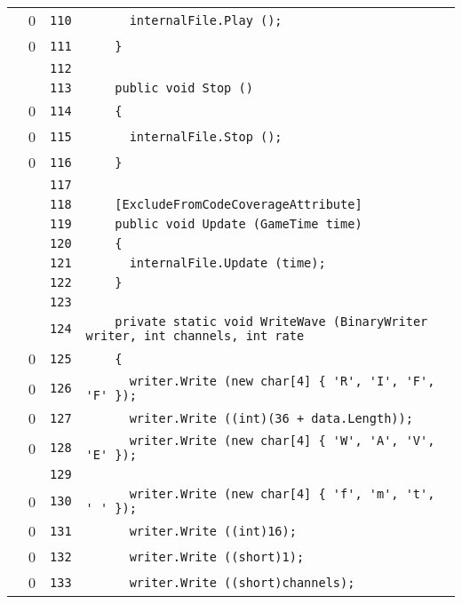 \documentclass[a4paper,10pt]{article}
\begin{document}
\begin{longtable}[l]{lrrl}
\cellcolor{red} & 0 & \verb~110~ & \verb~      internalFile.Play ();~\\
\cellcolor{red} & 0 & \verb~111~ & \verb~    }~\\
\cellcolor{gray} &  & \verb~112~ & \verb~~\\
\cellcolor{gray} &  & \verb~113~ & \verb~    public void Stop ()~\\
\cellcolor{red} & 0 & \verb~114~ & \verb~    {~\\
\cellcolor{red} & 0 & \verb~115~ & \verb~      internalFile.Stop ();~\\
\cellcolor{red} & 0 & \verb~116~ & \verb~    }~\\
\cellcolor{gray} &  & \verb~117~ & \verb~~\\
\cellcolor{gray} &  & \verb~118~ & \verb~    [ExcludeFromCodeCoverageAttribute]~\\
\cellcolor{gray} &  & \verb~119~ & \verb~    public void Update (GameTime time)~\\
\cellcolor{gray} &  & \verb~120~ & \verb~    {~\\
\cellcolor{gray} &  & \verb~121~ & \verb~      internalFile.Update (time);~\\
\cellcolor{gray} &  & \verb~122~ & \verb~    }~\\
\cellcolor{gray} &  & \verb~123~ & \verb~~\\
\cellcolor{gray} &  & \verb~124~ & \verb~    private static void WriteWave (BinaryWriter writer, int channels, int rate~\\
\cellcolor{red} & 0 & \verb~125~ & \verb~    {~\\
\cellcolor{red} & 0 & \verb~126~ & \verb~      writer.Write (new char[4] { 'R', 'I', 'F', 'F' });~\\
\cellcolor{red} & 0 & \verb~127~ & \verb~      writer.Write ((int)(36 + data.Length));~\\
\cellcolor{red} & 0 & \verb~128~ & \verb~      writer.Write (new char[4] { 'W', 'A', 'V', 'E' });~\\
\cellcolor{gray} &  & \verb~129~ & \verb~~\\
\cellcolor{red} & 0 & \verb~130~ & \verb~      writer.Write (new char[4] { 'f', 'm', 't', ' ' });~\\
\cellcolor{red} & 0 & \verb~131~ & \verb~      writer.Write ((int)16);~\\
\cellcolor{red} & 0 & \verb~132~ & \verb~      writer.Write ((short)1);~\\
\cellcolor{red} & 0 & \verb~133~ & \verb~      writer.Write ((short)channels);~\\

\end{longtable}
\end{document}
